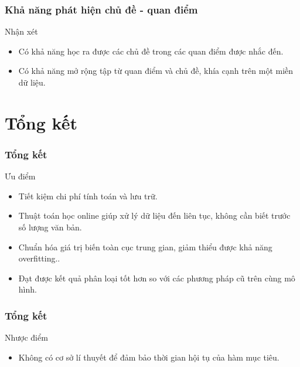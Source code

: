 \documentclass{beamer}
\begin{document}
\begin{frame}
\frametitle{Khả năng phát hiện chủ đề - quan điểm}
\begin{block}{Nhận xét}
\begin{itemize}
\item Có khả năng học ra được các chủ đề trong các quan điểm được nhắc đến.
\item Có khả năng mở rộng tập từ quan điểm và chủ đề, khía cạnh trên một miền dữ liệu.
\end{itemize}
\end{block}
\end{frame}

\section{Tổng kết}
\begin{frame}
\frametitle{Tổng kết}
\begin{block}{Ưu điểm}
\begin{itemize}
\item Tiết kiệm chi phí tính toán và lưu trữ.
\item Thuật toán học online giúp xử lý dữ liệu đến liên tục, không cần biết trước số lượng văn bản.
\item Chuẩn hóa giá trị biến toàn cục trung gian, giảm thiểu được khả năng overfitting..
\item Đạt được kết quả phân loại tốt hơn so với các phương pháp cũ trên cùng mô hình.
\end{itemize}
\end{block}
\end{frame}

\begin{frame}
\frametitle{Tổng kết}
\begin{block}{Nhược điểm}
\begin{itemize}
\item Không có cơ sở lí thuyết để đảm bảo thời gian hội tụ của hàm mục tiêu.
\end{itemize}
\end{block}
\end{frame}

  
%        
\end{document}
